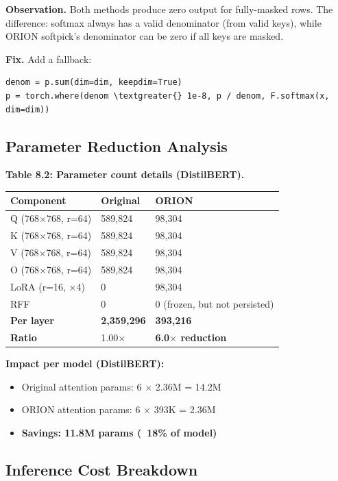 \textbf{Observation.} Both methods produce zero output for fully-masked rows. 
The difference: softmax always has a valid denominator (from valid keys), 
while ORION softpick's denominator can be zero if all keys are masked.

\textbf{Fix.} Add a fallback:

\begin{lstlisting}
denom = p.sum(dim=dim, keepdim=True)
p = torch.where(denom \textgreater{} 1e-8, p / denom, F.softmax(x, dim=dim))
\end{lstlisting}

\subsection{Parameter Reduction Analysis}

\textbf{Table 8.2: Parameter count details (DistilBERT).}

\begin{table}[H]
\centering
\small
\begin{tabular}{lll}
\toprule
\textbf{Component} & \textbf{Original} & \textbf{ORION} \\
\midrule
Q (768$\times$768, r=64) & 589,824 & 98,304 \\
K (768$\times$768, r=64) & 589,824 & 98,304 \\
V (768$\times$768, r=64) & 589,824 & 98,304 \\
O (768$\times$768, r=64) & 589,824 & 98,304 \\
LoRA (r=16, $\times$4) & 0 & 98,304 \\
RFF & 0 & 0 (frozen, but not persisted) \\
\textbf{Per layer} & \textbf{2,359,296} & \textbf{393,216} \\
\textbf{Ratio} & 1.00$\times$ & \textbf{6.0$\times$ reduction} \\
\bottomrule
\end{tabular}
\end{table}

\textbf{Impact per model (DistilBERT):}
\begin{itemize}
\item Original attention params: 6 $\times$ 2.36M = 14.2M
\item ORION attention params: 6 $\times$ 393K = 2.36M
\item \textbf{Savings: 11.8M params (~18\% of model)}

\end{itemize}
\subsection{Inference Cost Breakdown}

